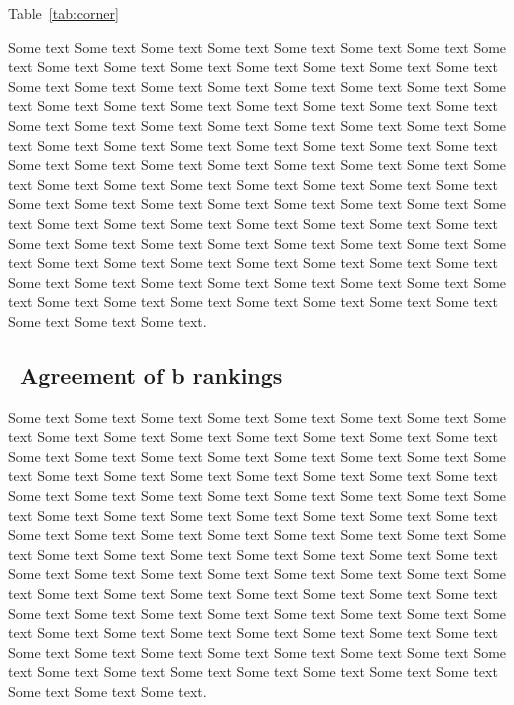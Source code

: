 \begin{multicols}{2}
Table~\ref{tab:corner}

  Some text Some text Some text Some text Some text Some text Some
  text Some text Some text Some text Some text Some text Some text
  Some text Some text Some text Some text Some text Some text Some
  text Some text Some text Some text Some text Some text Some text
  Some text Some text Some text Some text Some text Some text Some
  text Some text Some text Some text Some text Some text Some text
  Some text Some text Some text Some text Some text Some text Some
  text Some text Some text Some text Some text Some text Some text
  Some text Some text Some text Some text Some text Some text Some
  text Some text Some text Some text Some text Some text Some text
  Some text Some text Some text Some text Some text Some text Some
  text Some text Some text Some text Some text Some text Some text
  Some text Some text Some text Some text Some text Some text Some
  text Some text Some text Some text Some text Some text Some text
  Some text Some text Some text Some text Some text Some text Some
  text Some text Some text Some text Some text Some text Some text
  Some text Some text Some text Some text.

\subsection{\thesubsection~Agreement of b rankings}

  Some text Some text Some text Some text Some text Some text Some
  text Some text Some text Some text Some text Some text Some text
  Some text Some text Some text Some text Some text Some text Some
  text Some text Some text Some text Some text Some text Some text
  Some text Some text Some text Some text Some text Some text Some
  text Some text Some text Some text Some text Some text Some text
  Some text Some text Some text Some text Some text Some text Some
  text Some text Some text Some text Some text Some text Some text
  Some text Some text Some text Some text Some text Some text Some
  text Some text Some text Some text Some text Some text Some text
  Some text Some text Some text Some text Some text Some text Some
  text Some text Some text Some text Some text Some text Some text
  Some text Some text Some text Some text Some text Some text Some
  text Some text Some text Some text Some text Some text Some text
  Some text Some text Some text Some text Some text Some text Some
  text Some text Some text Some text Some text Some text Some text
  Some text Some text Some text Some text.


\end{multicols}
